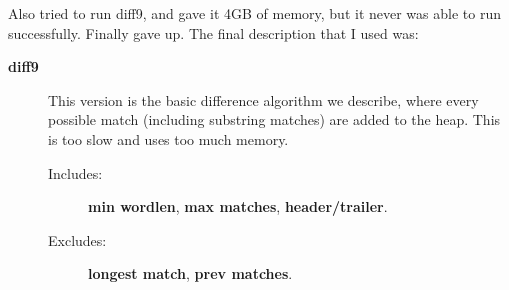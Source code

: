 Also tried to run diff9, and gave it 4GB of memory, but it never
was able to run successfully.  Finally gave up.
The final description that I used was:

\begin{description}
\item[\textbf{diff9}]
    This version is the basic difference algorithm we describe,
    where every possible match (including substring matches) are
    added to the heap.  This is too slow and uses too much memory.
    \begin{description}
    \item[Includes:]
        \textbf{min wordlen}, \textbf{max matches},
        \textbf{header/trailer}.
    \item[Excludes:]
        \textbf{longest match}, \textbf{prev matches}.
    \end{description}

\end{description}


